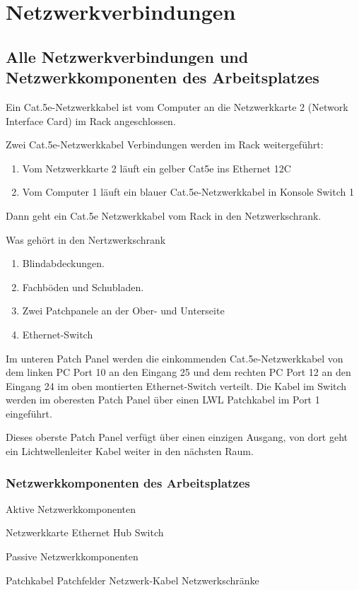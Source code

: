 \section{Netzwerkverbindungen}\label{sec:Netzwerk}


\subsection{Alle Netzwerkverbindungen und Netzwerkkomponenten des Arbeitsplatzes }\label{Dokumentation}

Ein Cat.5e-Netzwerkkabel ist vom Computer an die Netzwerkkarte 2 (Network Interface Card) im Rack
angeschlossen. 

Zwei Cat.5e-Netzwerkkabel Verbindungen werden im Rack weitergeführt: 

\begin{enumerate}
\item Vom Netzwerkkarte 2 läuft ein gelber Cat5e ins Ethernet 12C
\item Vom Computer 1 läuft ein blauer Cat.5e-Netzwerkkabel in Konsole Switch 1
\end{enumerate}

Dann geht ein Cat.5e Netzwerkkabel vom Rack in den Netzwerkschrank.

Was gehört in den Nertzwerkschrank

\begin{enumerate}
\item Blindabdeckungen.
\item Fachböden und Schubladen.
\item Zwei Patchpanele an der Ober- und Unterseite 
\item Ethernet-Switch
\end{enumerate}

Im unteren Patch Panel werden die einkommenden Cat.5e-Netzwerkkabel von dem linken PC Port 10 an den Eingang 25 und dem rechten PC Port 12 an den Eingang 24 im oben montierten Ethernet-Switch
verteilt. Die Kabel im Switch werden im oberesten Patch Panel über einen LWL Patchkabel im Port 1 eingeführt.

Dieses oberste Patch Panel verfügt über einen einzigen Ausgang, von dort geht ein Lichtwellenleiter Kabel weiter in den nächsten Raum.

\subsubsection{ Netzwerkkomponenten des Arbeitsplatzes}\label{Netzwerkomponenten}

Aktive Netzwerkkomponenten

Netzwerkkarte
Ethernet Hub
Switch

Passive Netzwerkkomponenten

Patchkabel
Patchfelder
Netzwerk-Kabel
Netzwerkschränke

